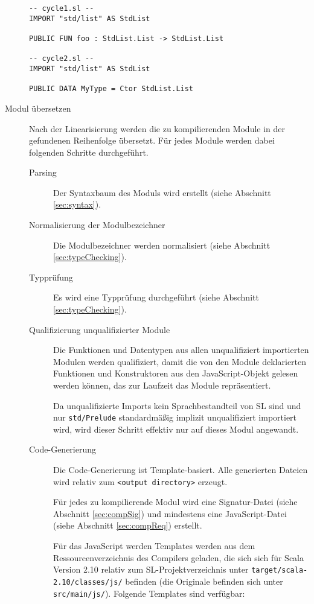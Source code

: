 \documentclass[runningheads]{llncs}
\begin{document}
\begin{description}
\begin{verbatim}
-- cycle1.sl --
IMPORT "std/list" AS StdList

PUBLIC FUN foo : StdList.List -> StdList.List

-- cycle2.sl --
IMPORT "std/list" AS StdList

PUBLIC DATA MyType = Ctor StdList.List
\end{verbatim}
    
\item[Modul übersetzen] Nach der Linearisierung werden die zu
    kompilierenden Module in der gefundenen Reihenfolge übersetzt. Für
    jedes Module werden dabei folgenden Schritte durchgeführt.
    \begin{description}
    \item[Parsing] Der Syntaxbaum des Moduls wird erstellt (siehe
        Abschnitt \ref{sec:syntax}).
    \item[Normalisierung der Modulbezeichner] Die Modulbezeichner
        werden normalisiert (siehe Abschnitt \ref{sec:typeChecking}).
    \item[Typprüfung] Es wird eine Typprüfung durchgeführt (siehe
        Abschnitt \ref{sec:typeChecking}).
    \item[Qualifizierung unqualifizierter Module] Die Funktionen und
        Datentypen aus allen unqualifiziert importierten Modulen werden
        qualifiziert, damit die von den Module deklarierten Funktionen
        und Konstruktoren aus den JavaScript-Objekt gelesen werden können,
        das zur Laufzeit das Module repräsentiert.

        Da unqualifizierte Imports kein Sprachbestandteil von SL sind
        und nur \texttt{std/Prelude} standardmäßig implizit
        unqualifiziert importiert wird, wird dieser Schritt effektiv
        nur auf dieses Modul angewandt.
    \item[Code-Generierung] Die Code-Generierung ist Template-basiert.
        Alle generierten Dateien wird relativ zum \texttt{<output
        directory>} erzeugt.
        
        Für jedes zu kompilierende Modul wird eine Signatur-Datei
        (siehe Abschnitt \ref{sec:compSig}) und mindestens
        eine JavaScript-Datei (siehe Abschnitt \ref{sec:compReq})
        erstellt.
        
        Für das JavaScript werden Templates werden aus dem
        Ressourcenverzeichnis des Compilers geladen, die sich sich für
        Scala Version 2.10 relativ zum SL-Projektverzeichnis unter
        \texttt{target/scala-2.10/classes/js/} befinden (die Originale
        befinden sich unter \texttt{src/main/js/}). Folgende Templates
        sind verfügbar:
        

\end{description}
\end{description}
\end{document}
